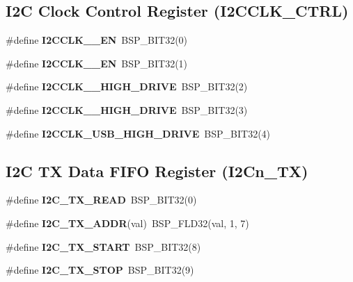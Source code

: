 \subsection*{I2C Clock Control Register (I2\+C\+C\+L\+K\+\_\+\+C\+T\+RL)}
\begin{DoxyCompactItemize}
\item 
\mbox{\label{group__lpc32xx__i2c_gaf8bb247ed085f248093b1ddfe05bbe68}} 
\#define {\bfseries I2\+C\+C\+L\+K\+\_\+\_\+\+EN}~B\+S\+P\+\_\+\+B\+I\+T32(0)
\item 
\mbox{\label{group__lpc32xx__i2c_ga901eacb0a7a4dea0d9da2becb195af8a}} 
\#define {\bfseries I2\+C\+C\+L\+K\+\_\+\_\+\+EN}~B\+S\+P\+\_\+\+B\+I\+T32(1)
\item 
\mbox{\label{group__lpc32xx__i2c_ga3b95227c4ade7123fe0eba143090d5d4}} 
\#define {\bfseries I2\+C\+C\+L\+K\+\_\+\_\+\+H\+I\+G\+H\+\_\+\+D\+R\+I\+VE}~B\+S\+P\+\_\+\+B\+I\+T32(2)
\item 
\mbox{\label{group__lpc32xx__i2c_ga2c1a50b202bab6610949e6f1aba5e6db}} 
\#define {\bfseries I2\+C\+C\+L\+K\+\_\+\_\+\+H\+I\+G\+H\+\_\+\+D\+R\+I\+VE}~B\+S\+P\+\_\+\+B\+I\+T32(3)
\item 
\mbox{\label{group__lpc32xx__i2c_gaf86a62baff3e836f55737b0d0811d384}} 
\#define {\bfseries I2\+C\+C\+L\+K\+\_\+\+U\+S\+B\+\_\+\+H\+I\+G\+H\+\_\+\+D\+R\+I\+VE}~B\+S\+P\+\_\+\+B\+I\+T32(4)
\end{DoxyCompactItemize}
\subsection*{I2C TX Data F\+I\+FO Register (I2\+Cn\+\_\+\+TX)}
\begin{DoxyCompactItemize}
\item 
\mbox{\label{group__lpc32xx__i2c_gaf546b1e0429e18fcfde8a2ad54960a28}} 
\#define {\bfseries I2\+C\+\_\+\+T\+X\+\_\+\+R\+E\+AD}~B\+S\+P\+\_\+\+B\+I\+T32(0)
\item 
\mbox{\label{group__lpc32xx__i2c_ga1f4f452d32919f19ba13ca6903a84971}} 
\#define {\bfseries I2\+C\+\_\+\+T\+X\+\_\+\+A\+D\+DR}(val)~B\+S\+P\+\_\+\+F\+L\+D32(val, 1, 7)
\item 
\mbox{\label{group__lpc32xx__i2c_ga6964f2ad477f6740c44b0813387b14a2}} 
\#define {\bfseries I2\+C\+\_\+\+T\+X\+\_\+\+S\+T\+A\+RT}~B\+S\+P\+\_\+\+B\+I\+T32(8)
\item 
\mbox{\label{group__lpc32xx__i2c_gacf844a72825cc06444bdd18f81ac3481}} 
\#define {\bfseries I2\+C\+\_\+\+T\+X\+\_\+\+S\+T\+OP}~B\+S\+P\+\_\+\+B\+I\+T32(9)
\end{DoxyCompactItemize}
